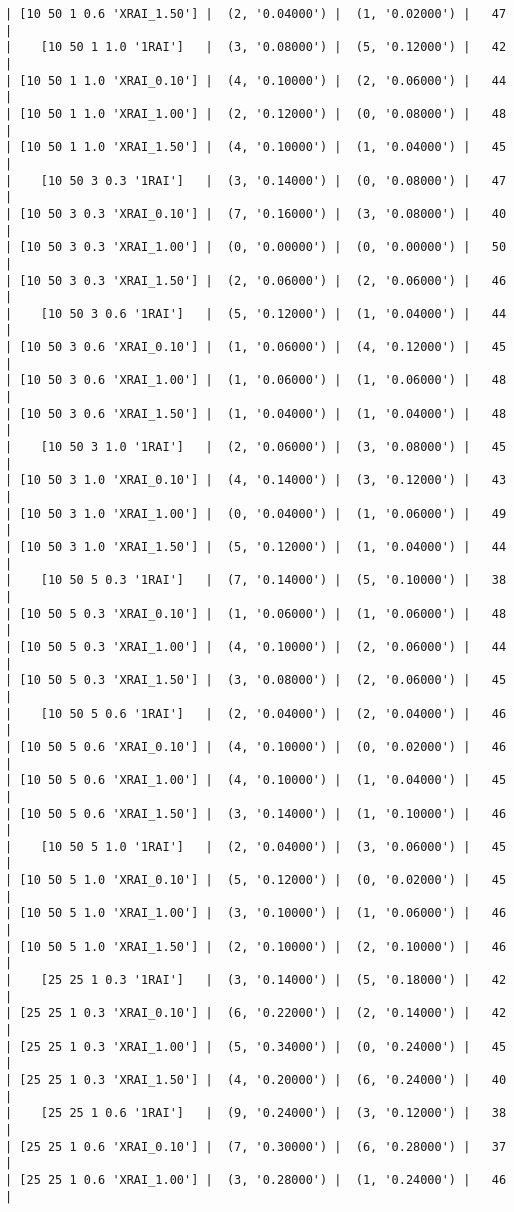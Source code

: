 \documentclass{article}
\begin{document}
\begin{verbatim}
| [10 50 1 0.6 'XRAI_1.50'] |  (2, '0.04000') |  (1, '0.02000') |   47  |
|    [10 50 1 1.0 '1RAI']   |  (3, '0.08000') |  (5, '0.12000') |   42  |
| [10 50 1 1.0 'XRAI_0.10'] |  (4, '0.10000') |  (2, '0.06000') |   44  |
| [10 50 1 1.0 'XRAI_1.00'] |  (2, '0.12000') |  (0, '0.08000') |   48  |
| [10 50 1 1.0 'XRAI_1.50'] |  (4, '0.10000') |  (1, '0.04000') |   45  |
|    [10 50 3 0.3 '1RAI']   |  (3, '0.14000') |  (0, '0.08000') |   47  |
| [10 50 3 0.3 'XRAI_0.10'] |  (7, '0.16000') |  (3, '0.08000') |   40  |
| [10 50 3 0.3 'XRAI_1.00'] |  (0, '0.00000') |  (0, '0.00000') |   50  |
| [10 50 3 0.3 'XRAI_1.50'] |  (2, '0.06000') |  (2, '0.06000') |   46  |
|    [10 50 3 0.6 '1RAI']   |  (5, '0.12000') |  (1, '0.04000') |   44  |
| [10 50 3 0.6 'XRAI_0.10'] |  (1, '0.06000') |  (4, '0.12000') |   45  |
| [10 50 3 0.6 'XRAI_1.00'] |  (1, '0.06000') |  (1, '0.06000') |   48  |
| [10 50 3 0.6 'XRAI_1.50'] |  (1, '0.04000') |  (1, '0.04000') |   48  |
|    [10 50 3 1.0 '1RAI']   |  (2, '0.06000') |  (3, '0.08000') |   45  |
| [10 50 3 1.0 'XRAI_0.10'] |  (4, '0.14000') |  (3, '0.12000') |   43  |
| [10 50 3 1.0 'XRAI_1.00'] |  (0, '0.04000') |  (1, '0.06000') |   49  |
| [10 50 3 1.0 'XRAI_1.50'] |  (5, '0.12000') |  (1, '0.04000') |   44  |
|    [10 50 5 0.3 '1RAI']   |  (7, '0.14000') |  (5, '0.10000') |   38  |
| [10 50 5 0.3 'XRAI_0.10'] |  (1, '0.06000') |  (1, '0.06000') |   48  |
| [10 50 5 0.3 'XRAI_1.00'] |  (4, '0.10000') |  (2, '0.06000') |   44  |
| [10 50 5 0.3 'XRAI_1.50'] |  (3, '0.08000') |  (2, '0.06000') |   45  |
|    [10 50 5 0.6 '1RAI']   |  (2, '0.04000') |  (2, '0.04000') |   46  |
| [10 50 5 0.6 'XRAI_0.10'] |  (4, '0.10000') |  (0, '0.02000') |   46  |
| [10 50 5 0.6 'XRAI_1.00'] |  (4, '0.10000') |  (1, '0.04000') |   45  |
| [10 50 5 0.6 'XRAI_1.50'] |  (3, '0.14000') |  (1, '0.10000') |   46  |
|    [10 50 5 1.0 '1RAI']   |  (2, '0.04000') |  (3, '0.06000') |   45  |
| [10 50 5 1.0 'XRAI_0.10'] |  (5, '0.12000') |  (0, '0.02000') |   45  |
| [10 50 5 1.0 'XRAI_1.00'] |  (3, '0.10000') |  (1, '0.06000') |   46  |
| [10 50 5 1.0 'XRAI_1.50'] |  (2, '0.10000') |  (2, '0.10000') |   46  |
|    [25 25 1 0.3 '1RAI']   |  (3, '0.14000') |  (5, '0.18000') |   42  |
| [25 25 1 0.3 'XRAI_0.10'] |  (6, '0.22000') |  (2, '0.14000') |   42  |
| [25 25 1 0.3 'XRAI_1.00'] |  (5, '0.34000') |  (0, '0.24000') |   45  |
| [25 25 1 0.3 'XRAI_1.50'] |  (4, '0.20000') |  (6, '0.24000') |   40  |
|    [25 25 1 0.6 '1RAI']   |  (9, '0.24000') |  (3, '0.12000') |   38  |
| [25 25 1 0.6 'XRAI_0.10'] |  (7, '0.30000') |  (6, '0.28000') |   37  |
| [25 25 1 0.6 'XRAI_1.00'] |  (3, '0.28000') |  (1, '0.24000') |   46  |

\end{verbatim}
\end{document}
